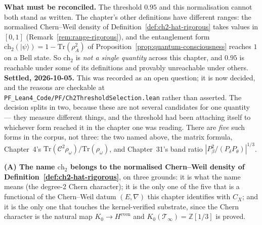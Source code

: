 \begin{remark}
\textbf{What must be reconciled.} The threshold $0.95$ and this normalisation
cannot both stand as written. The chapter's other definitions have different
ranges: the normalised Chern--Weil density of
Definition~\ref{def:ch2-hat-rigorous} takes values in $[0,1]$ (Remark~\ref{rem:range-rigorous}), and the entanglement
form $\text{ch}_2(|\psi\rangle) = 1 - \text{Tr}(\rho_A^2)$ of
Proposition~\ref{prop:quantum-consciousness} reaches $1$ on a Bell state. So
$\text{ch}_2$ is \emph{not a single quantity} across this chapter, and $0.95$ is
reachable under some of its definitions and provably unreachable under others.
\textbf{Settled, 2026-10-05.} This was recorded as an open question; it is
now decided, and the reasons are checkable at \texttt{PF\_Lean4\_Code/PF/Ch2ThresholdSelection.lean} rather than
asserted. The decision splits in two, because these are not several candidates
for one quantity --- they measure different things, and the threshold had been
attaching itself to whichever form reached it in the chapter one was reading.
There are \emph{five} such forms in the corpus, not three: the two named above,
the matrix formula, Chapter~4's $\mathrm{Tr}(\mathcal{C}^2\rho_\omega)/\mathrm{Tr}(\rho_\omega)$, and
Chapter~31's band ratio $|P_\beta^2/(P_\delta P_\theta)|^{1/3}$.

\textbf{(A) The name $\text{ch}_2$ belongs to the normalised Chern--Weil density
of Definition~\ref{def:ch2-hat-rigorous}}, on three grounds: it is what the name
means (the degree-2 Chern character); it is the only one of the five that is a
functional of the Chern--Weil datum $(E,\nabla)$ this chapter identifies with
$C_X$; and it is the only one that touches the kernel-verified substrate, since
the Chern character is the natural map $K_0 \to H^{\mathrm{even}}$ and
$K_0(\mathcal{T}_\infty) = \mathbb{Z}[1/3]$ is proved.


\end{remark}
